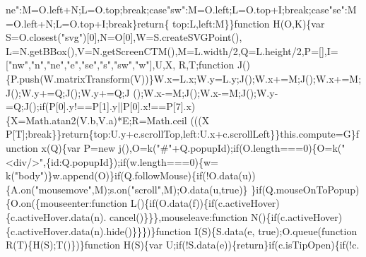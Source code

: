 \begin{DoxyCode}
{{      ne"}:M=O.left+N;L=O.top;\textcolor{keywordflow}{break};\textcolor{keywordflow}{case}\textcolor{stringliteral}{"sw"}:M=O.left;L=O.top+I;\textcolor{keywordflow}{break};\textcolor{keywordflow}{case}\textcolor{stringliteral}{"se"}:M=O.left+N;L=O.top+I;\textcolor{keywordflow}{break}\}\textcolor{keywordflow}{return}\{
      top:L,left:M\}\}\textcolor{keyword}{function} H(O,K)\{var S=O.closest(\textcolor{stringliteral}{"svg"})[0],N=O[0],W=S.createSVGPoint(),
      L=N.getBBox(),V=N.getScreenCTM(),M=L.width/2,Q=L.height/2,P=[],I=[\textcolor{stringliteral}{"nw"},\textcolor{stringliteral}{"n"},\textcolor{stringliteral}{"ne"},\textcolor{stringliteral}{"e"},\textcolor{stringliteral}{"se"},\textcolor{stringliteral}{"s"},\textcolor{stringliteral}{"sw"},\textcolor{stringliteral}{"w"}],U,X,
      R,T;\textcolor{keyword}{function} J()\{P.push(W.matrixTransform(V))\}W.x=L.x;W.y=L.y;J();W.x+=M;J();W.x+=M;J();W.y+=Q;J();W.y+=Q;J
      ();W.x-=M;J();W.x-=M;J();W.y-=Q;J();\textcolor{keywordflow}{if}(P[0].y!==P[1].y||P[0].x!==P[7].x)\{X=Math.atan2(V.b,V.a)*E;R=Math.ceil
      (((X%
      P[T];\textcolor{keywordflow}{break}\}\}\textcolor{keywordflow}{return}\{top:U.y+c.scrollTop,left:U.x+c.scrollLeft\}\}this.compute=G\}\textcolor{keyword}{function} 
      x(Q)\{var P=\textcolor{keyword}{new} j(),O=k(\textcolor{stringliteral}{"#"}+Q.popupId);\textcolor{keywordflow}{if}(O.length===0)\{O=k(\textcolor{stringliteral}{"<div/>"},\{\textcolor{keywordtype}{id}:Q.popupId\});\textcolor{keywordflow}{if}(w.length===0)\{w=
      k(\textcolor{stringliteral}{"body"})\}w.append(O)\}\textcolor{keywordflow}{if}(Q.followMouse)\{\textcolor{keywordflow}{if}(!O.data(u))\{A.on(\textcolor{stringliteral}{"mousemove"},M);s.on(\textcolor{stringliteral}{"scroll"},M);O.data(u,\textcolor{keyword}{true})\}
      \}\textcolor{keywordflow}{if}(Q.mouseOnToPopup)\{O.on(\{mouseenter:\textcolor{keyword}{function} L()\{\textcolor{keywordflow}{if}(O.data(f))\{\textcolor{keywordflow}{if}(c.activeHover)\{c.activeHover.data(n).
      cancel()\}\}\},mouseleave:\textcolor{keyword}{function} N()\{\textcolor{keywordflow}{if}(c.activeHover)\{c.activeHover.data(n).hide()\}\}\})\}\textcolor{keyword}{function} I(S)\{S.data(e,\textcolor{keyword}{
      true});O.queue(\textcolor{keyword}{function} R(T)\{H(S);T()\})\}\textcolor{keyword}{function} H(S)\{var U;\textcolor{keywordflow}{if}(!S.data(e))\{\textcolor{keywordflow}{return}\}\textcolor{keywordflow}{if}(c.isTipOpen)\{\textcolor{keywordflow}{if}(!c.
}
\end{DoxyCode}
